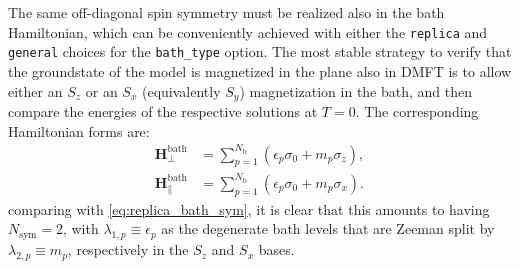 \documentclass[edipack_sp.tex]{subfiles}
\begin{document}
The same off-diagonal spin symmetry must be realized also in
the bath Hamiltonian, which can be conveniently achieved with
either the \texttt{replica} and \texttt{general} choices for 
the \texttt{bath\_type} option. The most stable strategy to 
verify that the groundstate of the model is magnetized in the
plane also in DMFT is to allow either an $S_z$ or an $S_x$ (equivalently $S_y$) magnetization in the bath, and then 
compare the energies of the respective solutions at $T=0$. 
The corresponding Hamiltonian forms are:
\begin{align}
    \mathbf{H}^\mathrm{bath}_\perp &= 
        \sum_{p=1}^{N_\mathrm{b}}(\epsilon_p \sigma_0 + m_p \sigma_z), 
        \label{eq:afmz_dmft_ansatz} \\[1mm]
    \mathbf{H}^\mathrm{bath}_\parallel &= 
        \sum_{p=1}^{N_\mathrm{b}}(\epsilon_p \sigma_0 + m_p \sigma_x).
        \label{eq:afmx_dmft_ansatz}
\end{align}
comparing with \ref{eq:replica_bath_sym}, it is clear 
that this amounts to having $N_\mathrm{sym}=2$, with
$\lambda_{1,p} \equiv \epsilon_p$ as the degenerate
bath levels that are Zeeman split by $\lambda_{2,p} \equiv m_p$, respectively in the $S_z$ and $S_x$ bases.
\end{document}
